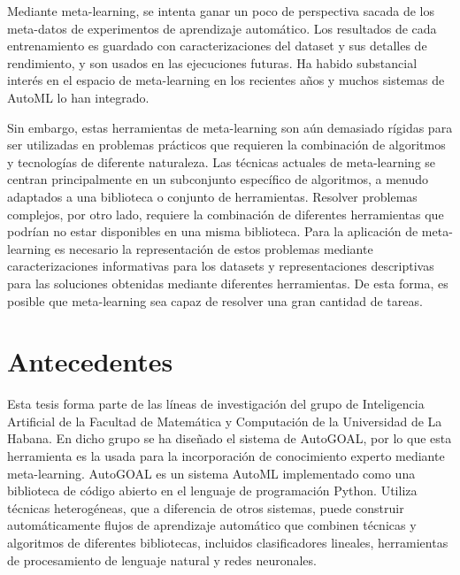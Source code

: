 
Mediante meta-learning, se intenta ganar un poco de perspectiva sacada de los meta-datos de experimentos de aprendizaje automático. Los resultados de cada entrenamiento es guardado con caracterizaciones del dataset y sus detalles de rendimiento, y son usados en las ejecuciones futuras. Ha habido substancial interés en el espacio de meta-learning en los recientes años y muchos sistemas de AutoML lo han integrado.

Sin embargo, estas herramientas de meta-learning son aún demasiado rígidas para ser utilizadas en problemas prácticos que requieren la combinación de algoritmos y tecnologías de diferente naturaleza. Las técnicas actuales de meta-learning se centran principalmente en un subconjunto específico de algoritmos, a menudo adaptados a una biblioteca o conjunto de herramientas. Resolver problemas complejos, por otro lado, requiere la combinación de diferentes herramientas que podrían no estar disponibles en una misma biblioteca. Para la aplicación de meta-learning es necesario la representación de estos problemas mediante caracterizaciones informativas para los datasets y representaciones descriptivas para las soluciones obtenidas mediante diferentes herramientas. De esta forma, es posible que meta-learning sea capaz de resolver una gran cantidad de tareas.

\section*{Antecedentes}

Esta tesis forma parte de las líneas de investigación del grupo de Inteligencia Artificial de la Facultad de Matemática y Computación de la Universidad de La Habana. En dicho grupo se ha diseñado el sistema de AutoGOAL,  por lo que esta herramienta es la usada para la incorporación de conocimiento experto mediante meta-learning. AutoGOAL es un sistema AutoML implementado como una biblioteca de código abierto en el lenguaje de programación Python. Utiliza técnicas heterogéneas, que a diferencia de otros sistemas, puede construir automáticamente flujos de aprendizaje automático que combinen técnicas y algoritmos de diferentes bibliotecas, incluidos clasificadores lineales, herramientas de procesamiento de lenguaje natural y redes neuronales.


